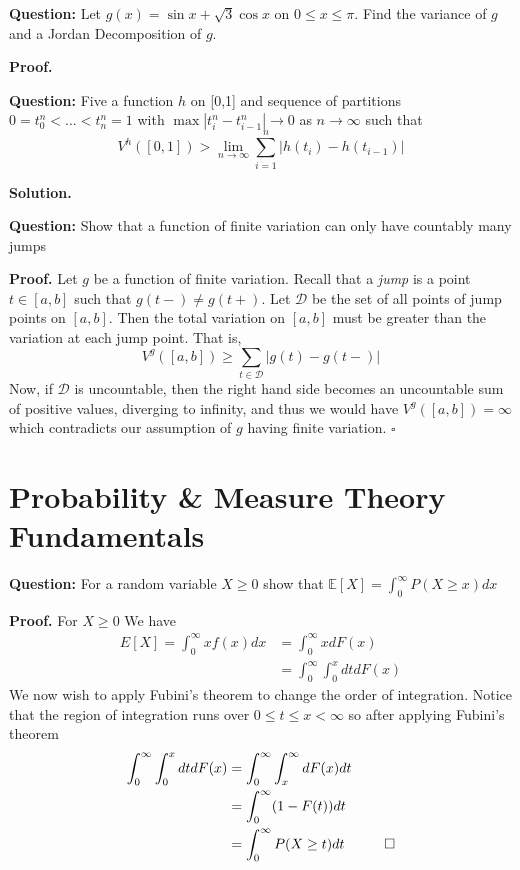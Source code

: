 \documentclass{article}
\begin{document}
\begin{tcolorbox}[colframe=black,colback=gray!5,boxrule=0.5pt]
\textbf{Question:} Let $g(x) = \sin x + \sqrt{3}\cos x$ on $0\leq x \leq \pi$. Find the variance of $g$ and a Jordan Decomposition of $g$.
\end{tcolorbox}
\textbf{Proof.}

\begin{tcolorbox}[colframe=black,colback=gray!5,boxrule=0.5pt]
\textbf{Question:} Five a function $h$ on [0,1] and sequence of partitions $0 = t_0^n < ... < t_n^n=1$ with $\max |t_i^n - t_{i-1}^n| \to 0$ as $n \to \infty$ such that $$V^h([0,1]) > \lim_{n\to\infty} \sum_{i=1}^{n}|h(t_{i}) - h(t_{i-1})|$$
\end{tcolorbox}
\textbf{Solution.}

\begin{tcolorbox}[colframe=black,colback=gray!5,boxrule=0.5pt]
\textbf{Question:} Show that a function of finite variation can only have countably many jumps
\end{tcolorbox}
\textbf{Proof.} Let $g$ be a function of finite variation. Recall that a \textit{jump} is a point $t\in[a,b]$ such that $g(t-) \neq g(t+)$. Let $\mathcal{D}$ be the set of all points of jump points on $[a,b]$. Then the total variation on $[a,b]$ must be greater than the variation at each jump point. That is, 
$$V^g([a,b])\geq \sum_{t\in\mathcal{D}}|g(t) - g(t-)|$$
Now, if $\mathcal{D}$ is uncountable, then the right hand side becomes an uncountable sum of positive values, diverging to infinity, and thus we would have $V^g([a,b])=\infty$ which contradicts our assumption of $g$ having finite variation. $\square$





\newpage
\section{Probability \& Measure Theory Fundamentals}

\begin{tcolorbox}[colframe=black,colback=gray!5,boxrule=0.5pt]
\textbf{Question:} For a random variable $X\geq0$ show that $\mathbb{E}[X] = \int_{0}^{\infty}P(X\geq x)dx$
\end{tcolorbox}
\textbf{Proof.} For $X\geq0$ We have 
\begin{align*}
    E[X] = \int_{0}^{\infty}xf(x)dx &= \int_{0}^{\infty} x dF(x) \\
    &= \int_{0}^{\infty}\int_{0}^{x}dtdF(x)
\end{align*}
We now wish to apply Fubini's theorem to change the order of integration. Notice that the region of integration runs over $0\leq t\leq x<\infty$ so after applying Fubini's theorem
\begin{align*}
    \int_{0}^{\infty}\int_{0}^{x}dtdF(x) &= \int_{0}^{\infty}\int_{x}^{\infty}dF(x)dt \\
    &=\int_{0}^{\infty}(1 - F(t))dt \\
    &= \int_{0}^{\infty} P(X\geq t)dt \hspace{10mm}
    \square\\
\end{align*}
\end{document}

